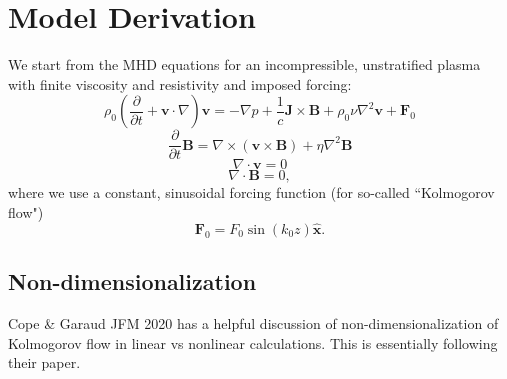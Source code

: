 \documentclass[aps,pop,preprint]{revtex4}
\begin{document}
	
	\section{Model Derivation}
	\label{sec:derivation}
	We start from the MHD equations for an incompressible, unstratified plasma with finite viscosity and resistivity and imposed forcing:
	\begin{equation}
	\rho_0 \left( \frac{\partial}{\partial t} + \mathbf{v} \cdot \nabla \right) \mathbf{v} = -\nabla p + \frac{1}{c} \mathbf{J} \times \mathbf{B} + \rho_0 \nu \nabla^2 \mathbf{v} + \mathbf{F}_0
	\end{equation}
	\begin{equation}
	\frac{\partial}{\partial t} \mathbf{B} = \nabla \times (\mathbf{v} \times \mathbf{B}) + \eta \nabla^2 \mathbf{B}
	\end{equation}
	\begin{equation}
	\nabla \cdot \mathbf{v} = 0
	\end{equation}
	\begin{equation}
	\nabla \cdot \mathbf{B} = 0,
	\end{equation}
	where we use a constant, sinusoidal forcing function (for so-called ``Kolmogorov flow")
	\begin{equation}
	\mathbf{F}_0 = F_0 \sin (k_0 z) \hat{\mathbf{x}}.
	\end{equation}
	
	\subsection{Non-dimensionalization}
	\label{derivation:subsec:nondim}
	Cope \& Garaud JFM 2020 has a helpful discussion of non-dimensionalization of Kolmogorov flow in linear vs nonlinear calculations. 
	This is essentially following their paper. 
	
\end{document}
